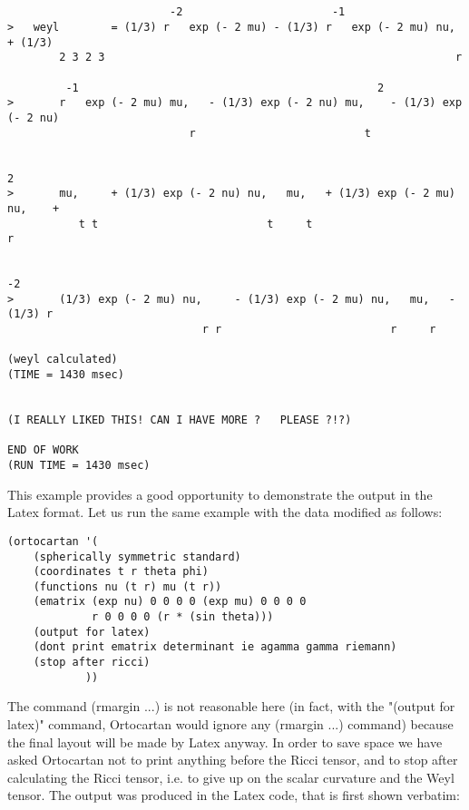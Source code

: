 \begin{verbatim}


                         -2                       -1
>   weyl        = (1/3) r   exp (- 2 mu) - (1/3) r   exp (- 2 mu) nu,   + (1/3)
        2 3 2 3                                                      r

         -1                                              2
>       r   exp (- 2 mu) mu,   - (1/3) exp (- 2 nu) mu,    - (1/3) exp (- 2 nu)
                            r                          t

                                                                           2
>       mu,     + (1/3) exp (- 2 nu) nu,   mu,   + (1/3) exp (- 2 mu) nu,    +
           t t                          t     t                          r

                                                                             -2
>       (1/3) exp (- 2 mu) nu,     - (1/3) exp (- 2 mu) nu,   mu,   - (1/3) r
                              r r                          r     r

(weyl calculated)
(TIME = 1430 msec)


(I REALLY LIKED THIS! CAN I HAVE MORE ?   PLEASE ?!?)

END OF WORK
(RUN TIME = 1430 msec)
\end{verbatim}

\bigskip

This example provides a good opportunity to demonstrate the output in the Latex
format. Let us run the same example with the data modified as follows:

\bigskip

\begin{verbatim}
(ortocartan '(
    (spherically symmetric standard)
    (coordinates t r theta phi)
    (functions nu (t r) mu (t r))
    (ematrix (exp nu) 0 0 0 0 (exp mu) 0 0 0 0
             r 0 0 0 0 (r * (sin theta)))
    (output for latex)
    (dont print ematrix determinant ie agamma gamma riemann)
    (stop after ricci)
            ))
\end{verbatim}

\bigskip

\noindent The command (rmargin ...) is not reasonable here (in fact, with the
"(output for latex)" command, Ortocartan would ignore any (rmargin ...)
command) because the final layout will be made by Latex anyway. In order to
save space we have asked Ortocartan not to print anything before the Ricci
tensor, and to stop after calculating the Ricci tensor, i.e. to give up on the
scalar curvature and the Weyl tensor. The output was produced in the Latex
code, that is first shown verbatim:

